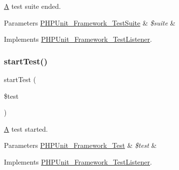 \mbox{\hyperlink{class_a}{A}} test suite ended.


\begin{DoxyParams}[1]{Parameters}
\mbox{\hyperlink{class_p_h_p_unit___framework___test_suite}{P\+H\+P\+Unit\+\_\+\+Framework\+\_\+\+Test\+Suite}} & {\em \$suite} & \\
\hline
\end{DoxyParams}


Implements \mbox{\hyperlink{interface_p_h_p_unit___framework___test_listener_aeec28a4d1328434916ebcdc1ca6b5527}{P\+H\+P\+Unit\+\_\+\+Framework\+\_\+\+Test\+Listener}}.

\mbox{\label{class_p_h_p_unit___framework___base_test_listener_a1a9bddc54f26bb3fb5c2ec9778ea5198}} 
\subsubsection{\texorpdfstring{start\+Test()}{startTest()}}
{\footnotesize\ttfamily start\+Test (\begin{DoxyParamCaption}\item[{\mbox{\hyperlink{interface_p_h_p_unit___framework___test}{P\+H\+P\+Unit\+\_\+\+Framework\+\_\+\+Test}}}]{\$test }\end{DoxyParamCaption})}

\mbox{\hyperlink{class_a}{A}} test started.


\begin{DoxyParams}[1]{Parameters}
\mbox{\hyperlink{interface_p_h_p_unit___framework___test}{P\+H\+P\+Unit\+\_\+\+Framework\+\_\+\+Test}} & {\em \$test} & \\
\hline
\end{DoxyParams}


Implements \mbox{\hyperlink{interface_p_h_p_unit___framework___test_listener_a1a9bddc54f26bb3fb5c2ec9778ea5198}{P\+H\+P\+Unit\+\_\+\+Framework\+\_\+\+Test\+Listener}}.

\mbox{\label{class_p_h_p_unit___framework___base_test_listener_a901a86a623d83184267b21f2daee0ff5}} 
